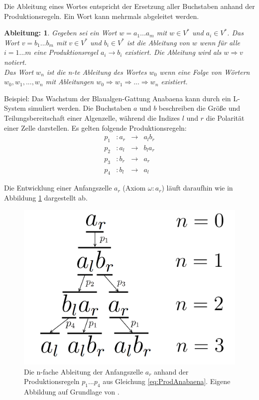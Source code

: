 Die Ableitung eines Wortes entspricht der Ersetzung aller Buchstaben anhand der Produktionsregeln. Ein Wort kann mehrmals abgeleitet werden. 

\newtheorem{defAbleitung}{Ableitung:}[chapter]
\begin{defAbleitung}
	Gegeben sei ein Wort $w = a_1 ... a_m$ mit $w \in V^*$ und $a_i \in V^*$. Das Wort $v = b_1 ... b_m$ mit $v \in V^*$ und $b_i \in V^*$ ist die Ableitung von $w$ wenn für alle $i=1...m$ eine Produktionsregel $a_i \rightarrow b_i$ existiert. Die Ableitung wird als $w \Rightarrow v$ notiert. \\
	Das Wort $w_n$ ist die n-te Ableitung des Wortes $w_0$ wenn eine Folge von Wörtern $w_0, w_1, ..., w_n$ mit Ableitungen $w_0 \Rightarrow w_1 \Rightarrow ... \Rightarrow w_n$ existiert. \cite[S.4]{ABOP:04} 
\end{defAbleitung}


Beispiel: Das Wachstum der Blaualgen-Gattung \glqq Anabaena\grqq{} kann durch ein L-System simuliert werden. Die Buchstaben $a$ und $b$ beschreiben die Größe und Teilungsbereitschaft einer Algenzelle, während die Indizes $l$ und $r$ die Polarität einer Zelle darstellen. Es gelten folgende Produktionsregeln:
\begin{equation}
\begin{array}{cccc}
 p_1 & : a_r &\rightarrow& a_lb_r \\
p_2 &  : a_l &\rightarrow& b_la_r \\ 
p_3 &  : b_r &\rightarrow& a_r \\
p_4 &  : b_l &\rightarrow& a_l 
\end{array}
\label{eq:ProdAnabaena}
\end{equation} 

Die Entwicklung einer Anfangszelle $a_r$ (Axiom $\omega : a_r$) läuft daraufhin wie in Abbildung \ref{fig:AnabaenaAbleitung} dargestellt ab.
\begin{figure} [hbtp]
	\centering
	\includegraphics[height=0.25\textheight]{images/AnabaenaAbleitung.png}
	\caption{Die n-fache Ableitung der Anfangszelle $a_r$ anhand der Produktionsregeln $p_1 ... p_4$ aus Gleichung \ref{eq:ProdAnabaena}. Eigene Abbildung auf Grundlage von \cite[S.4]{ABOP:04}.}
	\label{fig:AnabaenaAbleitung}
\end{figure}


